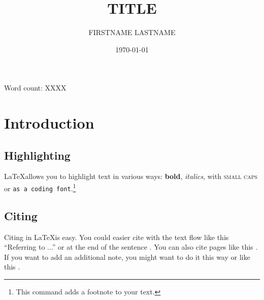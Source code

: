 \documentclass[11pt, a4paper]{article} %
\title{TITLE} %
\author{
FIRSTNAME LASTNAME %
  }
\date{\small \today} %
\begin{document}
%

\maketitle %

\begin{center} %
    Word count: XXXX
\end{center}

\setcounter{page}{1} %

\section{Introduction} %
\subsection{Highlighting} %
\LaTeX allows you to highlight text in various ways: \textbf{bold}, \textit{italics}, with \textsc{small caps} or \texttt{as a coding font}.\footnote{ This command adds a footnote to your text.} 

\subsection{Citing} %
Citing in \LaTeX is easy. You could easier cite with the text flow like this ``Referring to \citet{collier2004greed} ...''  or at the end of the sentence \cite{collier2004greed}. You can also cite pages like this \citep[55]{collier2004greed}. If you want to add an additional note, you might want to do it this way \citep[cp.][22]{collier2004greed} or like this \citep[cp.][]{collier2004greed}.\\
\blindtext %
\end{document}
